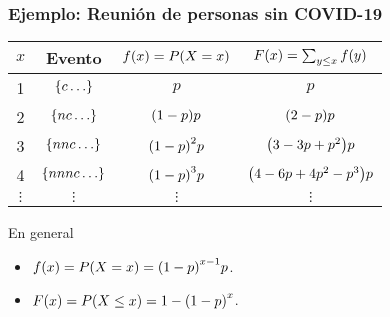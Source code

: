 \documentclass[table]{beamer}
\begin{document}
\begin{frame}
    \frametitle{Ejemplo: Reunión de personas sin COVID-19}
    \begin{center}
        \begin{tabular}{c|c|c|c}
            $x$ & Evento & $\ff{x} = \prob{X = x}$ & $\FF{x} = \sum_{y \leq x} \ff{y}$ \\
            \hline
            1 & $\bparens{c \ldots}$ & $p$ & $p$ \\
            2 & $\bparens{nc \ldots}$ & $\parens{1 - p} p$ & $\parens{2 - p} p$ \\
            3 & $\bparens{nnc \ldots}$ & $\parens{1 - p}^{2} p$ & $\parens{3 - 3 p + p^{2}} p$ \\
            4 & $\bparens{nnnc \ldots}$ & $\parens{1 - p}^{3} p$ & $\parens{4 - 6 p + 4 p^{2} - p^{3}} p$ \\
            $\vdots$ & $\vdots$ & $\vdots$ & $\vdots$
        \end{tabular}
    \end{center}
    \begin{block}{En general}
        \begin{itemize}
            \item $\ff{x} = \prob{X = x} = \parens{1 - p}^{x-1} p$.
            \item $\FF{x} = \prob{X \leq x} = 1 - \parens{1 - p}^{x }$.
        \end{itemize}
    \end{block}
\end{frame}
\end{document}
